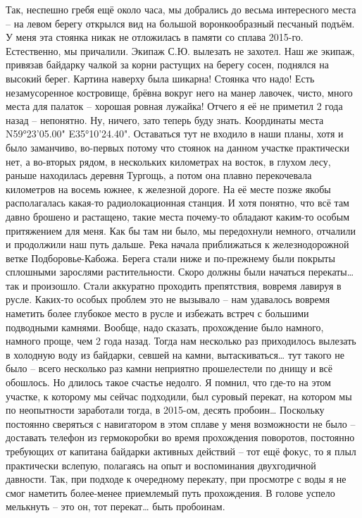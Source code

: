 Так, неспешно гребя ещё около часа, мы добрались до весьма интересного места – на левом берегу открылся вид на большой воронкообразный песчаный подъём. У меня эта стоянка никак не отложилась в памяти со сплава 2015-го. Естественно, мы причалили. Экипаж С.Ю. вылезать не захотел. Наш же экипаж, привязав байдарку чалкой за корни растущих на берегу сосен, поднялся на высокий берег. Картина наверху была шикарна! Стоянка что надо! Есть незамусоренное костровище, брёвна вокруг него на манер лавочек, чисто, много места для палаток – хорошая ровная лужайка! Отчего я её не приметил 2 года назад – непонятно. Ну, ничего, зато теперь буду знать. Координаты места N59°23'05.00" E35°10'24.40". Оставаться тут не входило в наши планы, хотя и было заманчиво, во-первых потому что стоянок на данном участке практически нет, а во-вторых рядом, в нескольких километрах на восток, в глухом лесу, раньше находилась деревня Тургощь, а потом она плавно перекочевала километров на восемь южнее, к железной дороге. На её месте позже якобы располагалась какая-то радиолокационная станция. И хотя понятно, что всё там давно брошено и растащено, такие места почему-то обладают каким-то особым притяжением для меня. Как бы там ни было, мы передохнули немного, отчалили и продолжили наш путь дальше.
Река начала приближаться к железнодорожной ветке Подборовье-Кабожа. Берега стали ниже и по-прежнему были покрыты сплошными зарослями растительности. Скоро должны были начаться перекаты… так и произошло. Стали аккуратно проходить препятствия, вовремя лавируя в русле. Каких-то особых проблем это не вызывало – нам удавалось вовремя наметить более глубокое место в русле и избежать встреч с большими подводными камнями. Вообще, надо сказать, прохождение было намного, намного проще, чем 2 года назад. Тогда нам несколько раз приходилось вылезать в холодную воду из байдарки, севшей на камни, вытаскиваться… тут такого не было – всего несколько раз камни неприятно прошелестели по днищу и всё обошлось. 
Но длилось такое счастье недолго. Я помнил, что где-то на этом участке, к которому мы сейчас подходили, был суровый перекат, на котором мы по неопытности заработали тогда, в 2015-ом, десять пробоин… 
Поскольку постоянно сверяться с навигатором в этом сплаве у меня возможности не было – доставать телефон из гермокоробки во время прохождения поворотов, постоянно требующих от капитана байдарки активных действий – тот ещё фокус, то я плыл практически вслепую, полагаясь на опыт и воспоминания двухгодичной давности. Так, при подходе к очередному перекату, при просмотре с воды я не смог наметить более-менее приемлемый путь прохождения. В голове успело мелькнуть – это он, тот перекат… быть пробоинам.
